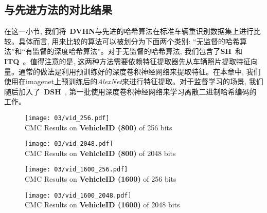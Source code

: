 \subsection{与先进方法的对比结果}
在这一小节, 我们将~\textbf{DVHN}与先进的哈希算法在标准车辆重识别数据集上进行比较。具体而言, 用来比较的算法可以被划分为下面两个类别: ``无监督的哈希算法''和``有监督的深度哈希算法''。对于无监督的哈希算法, 我们包含了\textbf{SH}~\cite{weiss2008spectral}和\textbf{ITQ}~\cite{gong2012iterative}。值得注意的是, 这两种方法需要依赖特征提取器先从车辆照片提取特征向量。通常的做法是利用预训练好的深度卷积神经网络来提取特征。在本章中, 我们使用在imagenet上预训练后的\textit{AlexNet}来进行特征提取。对于监督学习的场景, 我们随后加入了~\textbf{DSH}~\cite{liu2016deep}, 第一批使用深度卷积神经网络来学习离散二进制哈希编码的工作。
\begin{figure}[!htp]
    \centering
    \texttt{[image: 03/vid\_256.pdf]} \\
      {CMC Results on \textbf{VehicleID (800)} of 256 bits}
   \label{fig:vid256}
\end{figure}

\begin{figure}[!htp]
    \centering
    \texttt{[image: 03/vid\_2048.pdf]} \\
    {CMC Results on \textbf{VehicleID (800)} of 2048 bits}
   \label{fig:vid2048}
  \end{figure}

  \begin{figure}[!htp]
    \centering
    \texttt{[image: 03/vid\_1600\_256.pdf]} \\
    {CMC Results on \textbf{VehicleID (1600)} of 256 bits}
   \label{fig:vid1600_256}
  \end{figure}
  \begin{figure}[!htp]
    \centering
    \texttt{[image: 03/vid\_1600\_2048.pdf]} \\
    {CMC Results on \textbf{VehicleID (1600)} of 2048 bits}
   \label{fig:vid1600_2048}
  \end{figure}
  
